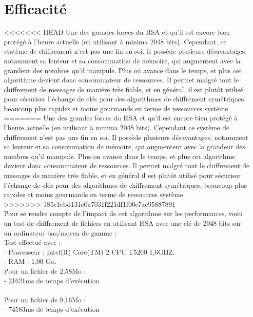 	\section{Efficacité}
<<<<<<< HEAD
		Une des grandes forces du RSA et qu'il est encore bien protégé à l'heure actuelle (en utilisant à minima 2048 bits). Cependant, ce système de chiffrement n'est pas une fin en soi. Il possède plusieurs désavantages, notamment sa lenteur et sa consommation de mémoire, qui augmentent avec la grandeur des nombres qu'il manipule. Plus on avance dans le temps, et plus cet algorithme devient donc consommateur de ressources. Il permet malgré tout le chiffrement de messages de manière très fiable, et en général, il est plutôt utilisé pour sécuriser l'échange de clés pour des algorithmes de chiffrement symétriques, beaucoup plus rapides et moins gourmands en terme de ressources système.\\
=======
		Une des grandes forces du RSA et qu'il est encore bien protégé à l'heure actuelle (en utilisant à minima 2048 bits). Cependant ce système de chiffrement n'est pas une fin en soi. Il possède plusieurs désavantages, notamment sa lenteur et sa consommation de mémoire, qui augmentent avec la grandeur des nombres qu'il manipule. Plus on avance dans le temps, et plus cet algorithme devient donc consommateur de ressources. Il permet malgré tout le chiffrement de messages de manière très fiable, et en général il est plutôt utilisé pour sécuriser l'échange de clés pour des algorithmes de chiffrement symétriques, beaucoup plus rapides et moins gourmands en terme de ressources système.\\
>>>>>>> 185c1cbd131e0a7031f221df1f00e7ac95887891
		\\
		Pour se rendre compte de l'impact de cet algorithme sur les performances, voici un test de chiffrement de fichiers en utilisant RSA avec une clé de 2048 bits sur un ordinateur bas/moyen de gamme :\\
			Test effectué avec :\\
			- Processeur : Intel(R) Core(TM) 2 CPU T5200 1,6GHZ.\\
			- RAM : 1,00 Go.\\
			
			Pour un fichier de 2,58Mo :\\
				- 21621ms de temps d'exécution\\\\ 
			Pour un fichier de 9,16Mo :\\
				- 74583ms de temps d'exécution\\
